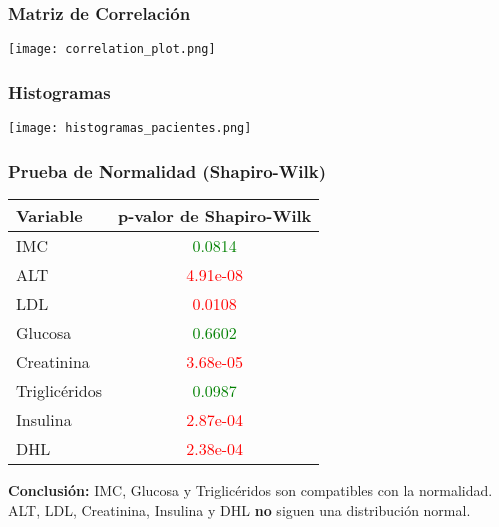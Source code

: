 \documentclass[
	11pt, %
]{beamer}
\begin{document}
\begin{frame}
    \frametitle{Matriz de Correlación} %
    \begin{center}
        \texttt{[image: correlation\_plot.png]} %
    \end{center}
\end{frame}


\begin{frame}
    \frametitle{Histogramas} %
    \begin{center}
        \texttt{[image: histogramas\_pacientes.png]} %
    \end{center}
\end{frame}



\begin{frame}
    \frametitle{Prueba de Normalidad (Shapiro-Wilk)}
    
    \scriptsize
    \begin{table}[]
        \centering
        \begin{tabular}{l c}
            \hline
            \textbf{Variable} & \textbf{p-valor de Shapiro-Wilk} \\
            \hline
            IMC & \textcolor{green}{0.0814} \\
            ALT & \textcolor{red}{4.91e-08} \\
            LDL & \textcolor{red}{0.0108} \\
            Glucosa & \textcolor{green}{0.6602} \\
            Creatinina & \textcolor{red}{3.68e-05} \\
            Triglicéridos & \textcolor{green}{0.0987} \\
            Insulina & \textcolor{red}{2.87e-04} \\
            DHL & \textcolor{red}{2.38e-04} \\
            \hline
        \end{tabular}
    \end{table}
    
    \vspace{0.4cm}
    \textbf{Conclusión:} IMC, Glucosa y Triglicéridos son compatibles con la normalidad.  
    ALT, LDL, Creatinina, Insulina y DHL \textbf{no} siguen una distribución normal.
\end{frame}
\end{document}
